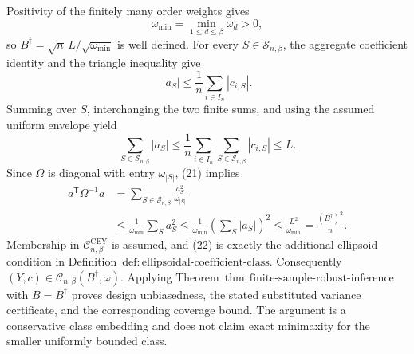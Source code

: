 Positivity of the finitely many order weights gives
\[
\omega_{\min}=\min_{1\le d\le\beta}\omega_d>0,
\]
so \(B^\dagger=\sqrt n\,L/\sqrt{\omega_{\min}}\) is well defined.  For every \(S\in\mathcal S_{n,\beta}\), the aggregate coefficient identity and the triangle inequality give
\[
|a_S|\le \frac1n\sum_{i\in I_n}|c_{i,S}|.
\]
Summing over \(S\), interchanging the two finite sums, and using the assumed uniform envelope yield
\[
\sum_{S\in\mathcal S_{n,\beta}}|a_S|
\le\frac1n\sum_{i\in I_n}
\sum_{S\in\mathcal S_{n,\beta}}|c_{i,S}|
\le L.
\tag{21}
\]
Since \(\Omega\) is diagonal with entry \(\omega_{|S|}\), (21) implies
\[
\begin{aligned}
a^{\mathsf T}\Omega^{-1}a
&=\sum_{S\in\mathcal S_{n,\beta}}\frac{a_S^2}{\omega_{|S|}}\\
&\le\frac1{\omega_{\min}}\sum_Sa_S^2
\le\frac1{\omega_{\min}}
\left(\sum_S|a_S|\right)^2
\le\frac{L^2}{\omega_{\min}}
=\frac{(B^\dagger)^2}{n}.
\end{aligned}
\tag{22}
\]
Membership in \(\mathcal C^{\mathrm{CEY}}_{n,\beta}\) is assumed, and (22) is exactly the additional ellipsoid condition in Definition~\(\mathrm{def{:}ellipsoidal\text{-}coefficient\text{-}class}\).  Consequently \((Y,c)\in\mathcal C_{n,\beta}(B^\dagger,\omega)\).  Applying Theorem~\(\mathrm{thm{:}finite\text{-}sample\text{-}robust\text{-}inference}\) with \(B=B^\dagger\) proves design unbiasedness, the stated substituted variance certificate, and the corresponding coverage bound.  The argument is a conservative class embedding and does not claim exact minimaxity for the smaller uniformly bounded class.